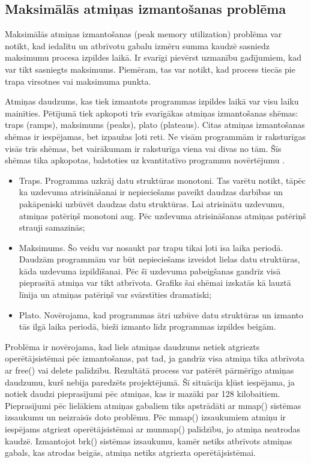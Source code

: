 

\subsection{Maksimālās atmiņas izmantošanas problēma}
 \label{sec:peak_mem}
 Maksimālās atmiņas izmantošanas (peak memory utilization) problēma var notikt, kad iedalītu un atbrīvotu gabalu izmēru summa kaudzē sasniedz maksimumu procesa izpildes laikā.
Ir svarīgi pievērst uzmanību gadījumiem, kad var tikt sasniegts maksimums.
Piemēram, tas var notikt, kad process tiecās pie trapa virsotnes vai maksimuma punkta.

Atmiņas daudzums, kas tiek izmantots programmas izpildes laikā var visu laiku mainīties.
Pētījumā \cite{PWMS} tiek apkopoti trīs svarīgākas atmiņas izmantošanas shēmas: traps (ramps),  maksimums (peaks),  plato (plateaus).
Citas atmiņas izmantošanas shēmas ir iespējamas, bet izpaužas ļoti reti.
Ne visām programmām ir raksturīgas visās trīs shēmas, bet vairākumam ir raksturīga viena vai divas no tām.
Šīs shēmas tika apkopotas, balstoties uz kvantitatīvo programmu novērtējumu \cite{PWMS}. 
\begin{itemize}
\item Traps. Programma uzkrāj datu struktūras monotoni. 
Tas varētu notikt, tāpēc ka uzdevuma atrisināšanai ir nepieciešams paveikt daudzas darbības un pakāpeniski uzbūvēt daudzas  datu struktūras. 
Lai atrisinātu uzdevumu, atmiņas patēriņš monotoni aug. Pēc uzdevuma atrisināšanas atmiņas patēriņš strauji samazinās;
\item Maksimums. Šo veidu var nosaukt par trapu tikai ļoti īsa laika periodā.
Daudzām programmām var būt nepieciešams izveidot lielas datu struktūras, kāda uzdevuma izpildīšanai.
Pēc šī uzdevuma pabeigšanas gandrīz visā pieprasītā atmiņa var tikt atbrīvota.
Grafiks šai shēmai izskatās kā lauztā līnija un atmiņas patēriņš var svārstīties dramatiski;
\item Plato. Novērojama, kad programmas ātri uzbūve datu struktūras un izmanto tās ilgā laika periodā, bieži izmanto līdz programmas izpildes beigām.
\end{itemize}


Problēma ir novērojama, kad liels atmiņas daudzums netiek atgriezts operētājsistēmai pēc izmantošanas, pat tad, ja gandrīz visa atmiņa tika atbrīvota ar free() vai delete palīdzību.
Rezultātā process var patērēt pārmērīgo atmiņas daudzumu, kurš nebija paredzēts projektējumā.
Šī situācija kļūst iespējama, ja notiek daudzi pieprasījumi pēc atmiņas, kas ir mazāki par 128 kilobaitiem.
Pieprasījumi pēc lielākiem atmiņas gabaliem tiks apstrādāti ar mmap() sistēmas izsaukumu un neizraisīs doto problēmu.
Pēc mmap() izsaukumiem atmiņu ir iespējams atgriezt operētājsistēmai ar munmap() palīdzību, jo atmiņa neatrodas kaudzē. 
Izmantojot brk() sistēmas izsaukumu, kamēr netiks atbrīvots atmiņas gabals, kas atrodas beigās, atmiņa netiks atgriezta operētājsistēmai.

